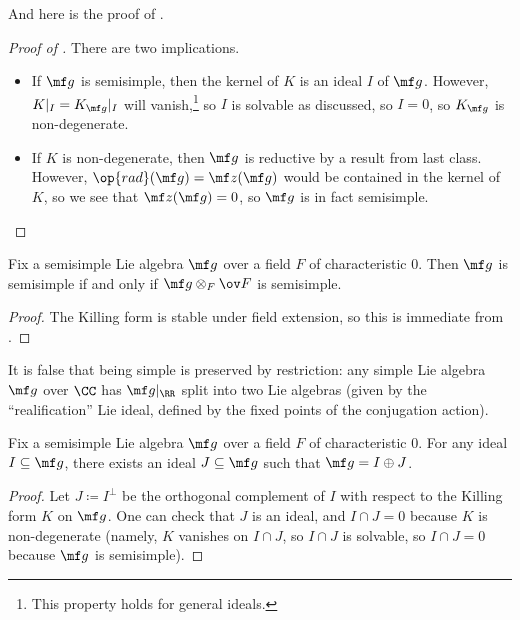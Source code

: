 \documentclass[../notes.tex]{subfiles}
\begin{document}
And here is the proof of .
\begin{proof}[Proof of ]
	There are two implications.
	\begin{itemize}
		\item If $\mf g$ is semisimple, then the kernel of $K$ is an ideal $I$ of $\mf g$. However, $K|_I=K_{\mf g}|_I$ will vanish,\footnote{This property holds for general ideals.} so $I$ is solvable as discussed, so $I=0$, so $K_{\mf g}$ is non-degenerate.
		\item If $K$ is non-degenerate, then $\mf g$ is reductive by a result from last class. However, $\op{rad}(\mf g)=\mf z(\mf g)$ would be contained in the kernel of $K$, so we see that $\mf z(\mf g)=0$, so $\mf g$ is in fact semisimple.
		\qedhere
	\end{itemize}
\end{proof}
\begin{corollary}
	Fix a semisimple Lie algebra $\mf g$ over a field $F$ of characteristic $0$. Then $\mf g$ is semisimple if and only if $\mf g\otimes_F\ov F$ is semisimple.
\end{corollary}
\begin{proof}
	The Killing form is stable under field extension, so this is immediate from .
\end{proof}
\begin{remark}
	It is false that being simple is preserved by restriction: any simple Lie algebra $\mf g$ over $\CC$ has $\mf g|_{\RR}$ split into two Lie algebras (given by the ``realification'' Lie ideal, defined by the fixed points of the conjugation action).
\end{remark}
\begin{corollary}
	Fix a semisimple Lie algebra $\mf g$ over a field $F$ of characteristic $0$. For any ideal $I\subseteq\mf g$, there exists an ideal $J\subseteq\mf g$ such that $\mf g=I\oplus J$.
\end{corollary}
\begin{proof}
	Let $J\coloneqq I^\perp$ be the orthogonal complement of $I$ with respect to the Killing form $K$ on $\mf g$. One can check that $J$ is an ideal, and $I\cap J=0$ because $K$ is non-degenerate (namely, $K$ vanishes on $I\cap J$, so $I\cap J$ is solvable, so $I\cap J=0$ because $\mf g$ is semisimple).
\end{proof}
\end{document}
